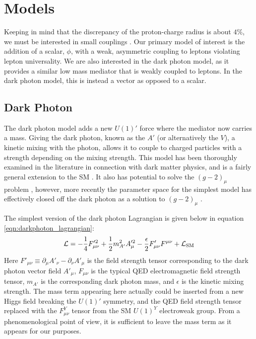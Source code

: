 \section{Models}

Keeping in mind that the discrepancy of the proton-charge radius is about $4\%$, we must be interested in small couplings \cite{Carlson:2015jba}.
Our primary model of interest is the addition of a scalar, $\phi$, with a weak, asymmetric coupling to leptons violating lepton universality.
We are also interested in the dark photon model, as it provides a similar low mass mediator that is weakly coupled to leptons.
In the dark photon model, this is instead a vector as opposed to a scalar.

\subsection{Dark Photon}
The dark photon model adds a new $U(1)'$ force where the mediator now carries a mass.
Giving the dark photon, known as the $A'$ (or alternatively the $V$), a kinetic mixing with the photon, allows it to couple to charged particles with a strength depending on the mixing strength.
This model has been thoroughly examined in the literature in connection with dark matter physics, and is a fairly general extension to the SM \cite{Holdom:1985ag}.
It also has potential to solve the $(g-2)_\mu$ problem \cite{Pospelov:2008zw}, however, more recently the parameter space for the simplest model has effectively closed off the dark photon as a solution to $(g-2)_\mu$ \cite{Batley:2015lha}.

The simplest version of the dark photon Lagrangian is given below in equation \ref{eqn:darkphoton_lagrangian}:
\begin{equation}
\label{eqn:darkphoton_lagrangian}
\operatorname{\mathcal{L}} = -\frac{1}{4}F'^2_{\mu\nu} + \frac{1}{2}m_{A'}^2 A'^2_\mu - \frac{\epsilon}{2}F'_{\mu\nu} F^{\mu\nu} + \operatorname{\mathcal{L}}_{\textrm{SM}}
\end{equation}
Here $F'_{\mu\nu} \equiv \partial_\mu A'_\nu - \partial_\nu A'_\mu$ is the field strength tensor corresponding to the dark photon vector field $A'_\mu$, $F_{\mu\nu}$ is the typical QED electromagnetic field strength tensor, $m_{A'}$ is the corresponding dark photon mass, and $\epsilon$ is the kinetic mixing strength.
The mass term appearing here actually could be inserted from a new Higgs field breaking the $U(1)'$ symmetry, and the QED field strength tensor replaced with the $F^Y_{\mu\nu}$ tensor from the SM $U(1)^Y$ electroweak group.
From a phenomenological point of view, it is sufficient to leave the mass term as it appears for our purposes.


